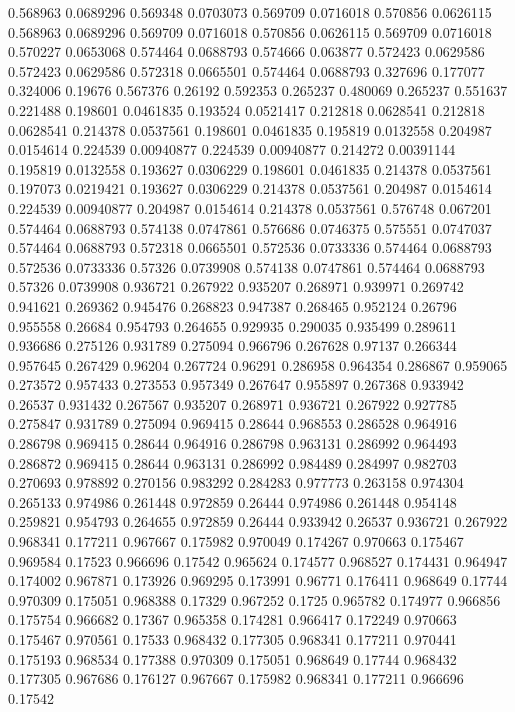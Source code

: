 0.568963 0.0689296
0.569348 0.0703073
0.569709 0.0716018
0.570856 0.0626115
0.568963 0.0689296
0.569709 0.0716018
0.570856 0.0626115
0.569709 0.0716018
0.570227 0.0653068
0.574464 0.0688793
0.574666 0.063877
0.572423 0.0629586
0.572423 0.0629586
0.572318 0.0665501
0.574464 0.0688793
0.327696 0.177077
0.324006 0.19676
0.567376 0.26192
0.592353 0.265237
0.480069 0.265237
0.551637 0.221488
0.198601 0.0461835
0.193524 0.0521417
0.212818 0.0628541
0.212818 0.0628541
0.214378 0.0537561
0.198601 0.0461835
0.195819 0.0132558
0.204987 0.0154614
0.224539 0.00940877
0.224539 0.00940877
0.214272 0.00391144
0.195819 0.0132558
0.193627 0.0306229
0.198601 0.0461835
0.214378 0.0537561
0.197073 0.0219421
0.193627 0.0306229
0.214378 0.0537561
0.204987 0.0154614
0.224539 0.00940877
0.204987 0.0154614
0.214378 0.0537561
0.576748 0.067201
0.574464 0.0688793
0.574138 0.0747861
0.576686 0.0746375
0.575551 0.0747037
0.574464 0.0688793
0.572318 0.0665501
0.572536 0.0733336
0.574464 0.0688793
0.572536 0.0733336
0.57326 0.0739908
0.574138 0.0747861
0.574464 0.0688793
0.57326 0.0739908
0.936721 0.267922
0.935207 0.268971
0.939971 0.269742
0.941621 0.269362
0.945476 0.268823
0.947387 0.268465
0.952124 0.26796
0.955558 0.26684
0.954793 0.264655
0.929935 0.290035
0.935499 0.289611
0.936686 0.275126
0.931789 0.275094
0.966796 0.267628
0.97137 0.266344
0.957645 0.267429
0.96204 0.267724
0.96291 0.286958
0.964354 0.286867
0.959065 0.273572
0.957433 0.273553
0.957349 0.267647
0.955897 0.267368
0.933942 0.26537
0.931432 0.267567
0.935207 0.268971
0.936721 0.267922
0.927785 0.275847
0.931789 0.275094
0.969415 0.28644
0.968553 0.286528
0.964916 0.286798
0.969415 0.28644
0.964916 0.286798
0.963131 0.286992
0.964493 0.286872
0.969415 0.28644
0.963131 0.286992
0.984489 0.284997
0.982703 0.270693
0.978892 0.270156
0.983292 0.284283
0.977773 0.263158
0.974304 0.265133
0.974986 0.261448
0.972859 0.26444
0.974986 0.261448
0.954148 0.259821
0.954793 0.264655
0.972859 0.26444
0.933942 0.26537
0.936721 0.267922
0.968341 0.177211
0.967667 0.175982
0.970049 0.174267
0.970663 0.175467
0.969584 0.17523
0.966696 0.17542
0.965624 0.174577
0.968527 0.174431
0.964947 0.174002
0.967871 0.173926
0.969295 0.173991
0.96771 0.176411
0.968649 0.17744
0.970309 0.175051
0.968388 0.17329
0.967252 0.1725
0.965782 0.174977
0.966856 0.175754
0.966682 0.17367
0.965358 0.174281
0.966417 0.172249
0.970663 0.175467
0.970561 0.17533
0.968432 0.177305
0.968341 0.177211
0.970441 0.175193
0.968534 0.177388
0.970309 0.175051
0.968649 0.17744
0.968432 0.177305
0.967686 0.176127
0.967667 0.175982
0.968341 0.177211
0.966696 0.17542
